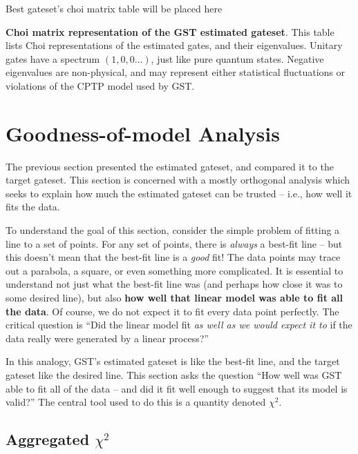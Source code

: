 \documentclass{article}[11pt]
\newcommand{\putfield}[2]{#2}
\begin{document}
\begin{table}[h]
\begin{center}
\putfield{bestGatesetChoiTable}{Best gateset's choi matrix table will be placed here}
\caption{\putfield{tt_bestGatesetChoiTable}{}\textbf{Choi matrix representation of the GST estimated gateset}.  This table lists Choi representations of the estimated gates, and their eigenvalues.  Unitary gates have a spectrum $(1,0,0\ldots)$, just like pure quantum states.  Negative eigenvalues are non-physical, and may represent either statistical fluctuations or violations of the CPTP model used by GST.\label{bestGatesetChoiTable}}
\end{center}
\end{table}



\section{Goodness-of-model Analysis\label{secGoodness}}

The previous section presented the estimated gateset, and compared it to the target gateset.  This section is concerned with a mostly orthogonal analysis which seeks to explain how much the estimated gateset can be trusted -- i.e., how well it fits the data.

To understand the goal of this section, consider the simple problem of fitting a line to a set of points.  For any set of points, there is \emph{always} a best-fit line -- but this doesn't mean that the best-fit line is a \emph{good} fit!  The data points may trace out a parabola, a square, or even something more complicated.  It is essential to understand not just what the best-fit line was (and perhaps how close it was to some desired line), but also \textbf{how well that linear model was able to fit all the data}.  Of course, we do not expect it to fit every data point perfectly.  The critical question is ``Did the linear model fit \emph{as well as we would expect it to} if the data really were generated by a linear process?''

In this analogy, GST's estimated gateset is like the best-fit line, and the target gateset like the desired line.  This section asks the question ``How well was GST able to fit all of the data -- and did it fit well enough to suggest that its model is valid?'' The central tool used to do this is a quantity denoted $\chi^2$.  

\subsection{Aggregated $\chi^2$}
\end{document}
